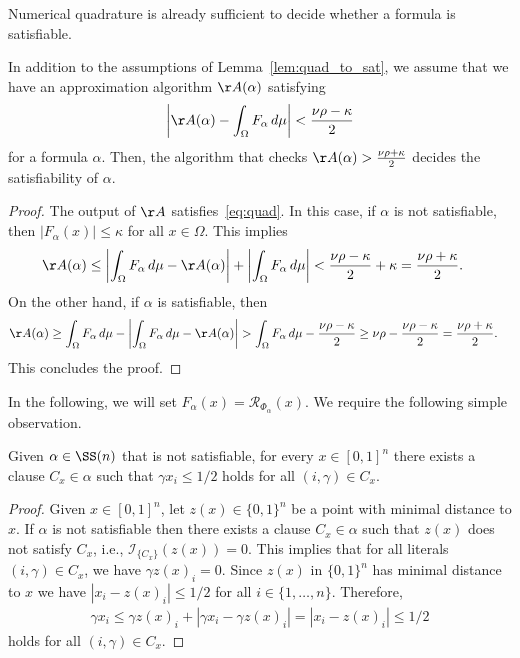 \documentclass{amsart}[11pt]
\numberwithin{equation}{section}
\newcommand{\realization}{\mathcal{R}}
\newcommand{\interpretation}{\mathcal{I}}
\numberwithin{theorem}{section}
\begin{document}
Numerical quadrature is already sufficient to decide whether a formula is satisfiable. 

\begin{lemma}\label{lem:quad_to_sat_algorithm}
    In addition to the assumptions of Lemma~\ref{lem:quad_to_sat}, we assume that we have an approximation algorithm $\AA(\alpha)$ satisfying 
    \begin{align}\label{eq:quad}
        \left|\AA(\alpha) - \int_{\Omega} F_\alpha \, d\mu\right| < \frac{\nu\rho - \kappa}{2}
    \end{align}
    for a formula $\alpha$.
    Then, the algorithm that checks $\AA(\alpha) > \frac{\nu \rho + \kappa}{2}$ decides the satisfiability of $\alpha$.
\end{lemma}
\begin{proof}
    The output of $\AA$ satisfies~\eqref{eq:quad}. In this case, if $\alpha$ is not satisfiable, then $|F_\alpha(x)| \leq \kappa$ for all $x \in \Omega$. This implies
    \begin{align*}
        \AA(\alpha) &\leq \left|\int_{\Omega} F_\alpha \, d\mu - \AA(\alpha)\right| + \left|\int_{\Omega} F_\alpha \, d\mu \right| < \frac{\nu \rho - \kappa}{2} + \kappa = \frac{\nu \rho + \kappa}{2}.
    \end{align*}
    On the other hand, if $\alpha$ is satisfiable, then
    \begin{align*}
        \AA(\alpha) &\geq \int_{\Omega} F_\alpha \, d\mu - \left|\int_{\Omega} F_\alpha \, d\mu - \AA(\alpha)\right| >  \int_{\Omega} F_\alpha \, d\mu - \frac{\nu \rho - \kappa}{2} \geq \nu \rho - \frac{\nu \rho - \kappa}{2} = \frac{\nu \rho + \kappa}{2}.
    \end{align*}
    This concludes the proof.
\end{proof}


In the following, we will set $F_\alpha(x)=\realization_{\Phi_\alpha}(x)$. We require the following simple observation.
\begin{lemma}\label{lem:not_satisfiable}
    Given $\alpha\in\SS(n)$ that is not satisfiable, for every $x \in [0, 1]^n$ there exists a clause $C_x \in \alpha$ such that $\gamma x_i \leq 1/2$ holds for all $(i, \gamma) \in C_x$.
\end{lemma}
\begin{proof}
    Given $x \in [0, 1]^n$, let $z(x) \in \{0, 1\}^n$ be a point with minimal distance to $x$. If $\alpha$ is not satisfiable then there exists a clause $C_x \in \alpha$ such that $z(x)$ does not satisfy $C_x$, i.e., $\interpretation_{\{C_x\}}(z(x))=0$. This implies that for all literals $(i, \gamma) \in C_x$, we have $\gamma z(x)_i = 0$. Since $z(x)$ in $\{0, 1\}^n$ has minimal distance to $x$ we have $|x_i - z(x)_i| \leq 1/2$ for all $i \in \{1, \ldots, n\}$. Therefore,
    \begin{align*}
        \gamma x_i \leq \gamma z(x)_i + |\gamma x_i - \gamma z(x)_i| = |x_i - z(x)_i| \leq 1/2
    \end{align*}
    holds for all $(i, \gamma) \in C_x$.
\end{proof}
\end{document}
